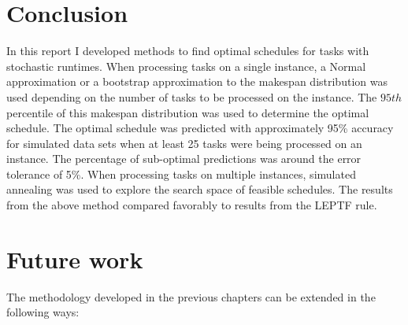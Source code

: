 \documentclass[12pt]{report}
\begin{document}
\section{Conclusion}

In this report I developed methods to find optimal schedules for tasks with stochastic runtimes. 
When processing tasks on a single instance, a Normal approximation or a bootstrap approximation to the makespan distribution was used depending on the number of tasks to be processed on the instance.
The $95th$ percentile of this makespan distribution was used to determine the optimal schedule.
The optimal schedule was predicted with approximately 95\% accuracy for simulated data sets when at least 25 tasks were being processed on an instance. 
The percentage of sub-optimal predictions was around the error tolerance of 5\%. 
When processing tasks on multiple instances, simulated annealing was used to explore the search space of feasible schedules.
The results from the above method compared favorably to results from the LEPTF rule.

\section{Future work}

The methodology developed in the previous chapters can be extended in the following ways:
\end{document}
